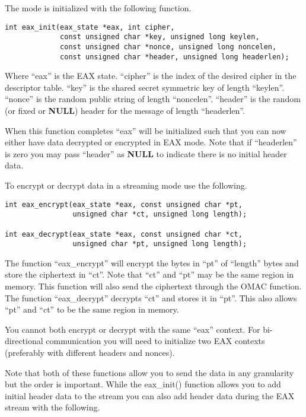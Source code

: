 \documentclass[a4paper]{book}
\begin{document}
The mode is initialized with the following function.
\begin{verbatim}
int eax_init(eax_state *eax, int cipher, 
             const unsigned char *key, unsigned long keylen,
             const unsigned char *nonce, unsigned long noncelen,
             const unsigned char *header, unsigned long headerlen);
\end{verbatim}

Where ``eax'' is the EAX state.  ``cipher'' is the index of the desired cipher in the descriptor table.  
``key'' is the shared secret symmetric key of length ``keylen''.  ``nonce'' is the random public string of
length ``noncelen''.  ``header'' is the random (or fixed or \textbf{NULL}) header for the message of length
``headerlen''.

When this function completes ``eax'' will be initialized such that you can now either have data decrypted or 
encrypted in EAX mode.  Note that if ``headerlen'' is zero you may pass ``header'' as \textbf{NULL} to indicate
there is no initial header data.

To encrypt or decrypt data in a streaming mode use the following.
 
\begin{verbatim}
int eax_encrypt(eax_state *eax, const unsigned char *pt, 
                unsigned char *ct, unsigned long length);

int eax_decrypt(eax_state *eax, const unsigned char *ct, 
                unsigned char *pt, unsigned long length);
\end{verbatim}
The function ``eax\_encrypt'' will encrypt the bytes in ``pt'' of ``length'' bytes and store the ciphertext in
``ct''.  Note that ``ct'' and ``pt'' may be the same region in memory.   This function will also send the ciphertext
through the OMAC function.  The function ``eax\_decrypt'' decrypts ``ct'' and stores it in ``pt''.  This also allows 
``pt'' and ``ct'' to be the same region in memory.  

You cannot both encrypt or decrypt with the same ``eax'' context.  For bi-directional communication you
will need to initialize two EAX contexts (preferably with different headers and nonces).  

Note that both of these functions allow you to send the data in any granularity but the order is important.  While
the eax\_init() function allows you to add initial header data to the stream you can also add header data during the
EAX stream with the following.
\end{document}
